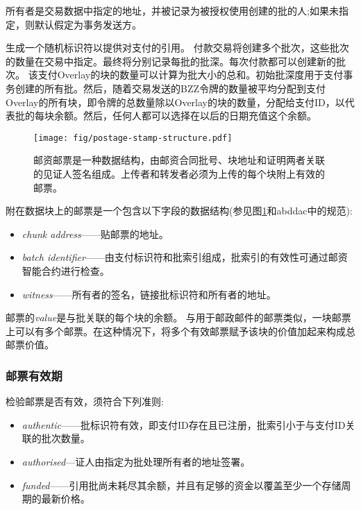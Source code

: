 所有者是交易数据中指定的地址，并被记录为被授权使用创建的批的人;如果未指定，则默认假定为事务发送方。

生成一个随机标识符以提供对支付的引用。
付款交易将创建多个批次，这些批次的数量在交易中指定。最终将分别记录每批的批深。每次付款都可以创建新的批次。
该支付Overlay的块的数量可以计算为批大小的总和。初始批深度用于支付事务创建的所有批。然后，随着交易发送的BZZ令牌的数量被平均分配到支付Overlay的所有块，即令牌的总数量除以Overlay的块的数量，分配给支付ID，以代表批的每块余额。然后，任何人都可以选择在以后的日期充值这个余额。 


\begin{figure}[htbp]
  \centering
    \texttt{[image: fig/postage-stamp-structure.pdf]}
  \caption[邮票\statusgreen]{邮资邮票是一种数据结构，由邮资合同批号、块地址和证明两者关联的见证人签名组成。上传者和转发者必须为上传的每个块附上有效的邮票。 }
  \label{fig:postage-stamp}
\end{figure}


附在数据块上的邮票是一个包含以下字段的数据结构(参见图\ref{fig:postage-stamp}和abddac中的规范):

\begin{itemize}
    \item \emph{chunk address}——贴邮票的地址。 
    \item \emph{batch identifier}——由支付标识符和批索引组成，批索引的有效性可通过邮资智能合约进行检查。
    \item \emph{witness}——所有者的签名，链接批标识符和所有者的地址。
\end{itemize}

邮票的\emph{value}是与批关联的每个块的余额。
与用于邮政邮件的邮票类似，一块邮票上可以有多个邮票。在这种情况下，将多个有效邮票赋予该块的价值加起来构成总邮票价值。 

\subsubsection{邮票有效期}

检验邮票是否有效，须符合下列准则:

\begin{itemize}
\item \emph{authentic}——批标识符有效，即支付ID存在且已注册，批索引小于与支付ID关联的批次数量。
\item \emph{authorised}—证人由指定为批处理所有者的地址签署。
\item \emph{funded}——引用批尚未耗尽其余额，并且有足够的资金以覆盖至少一个存储周期的最新价格。
\end{itemize}

